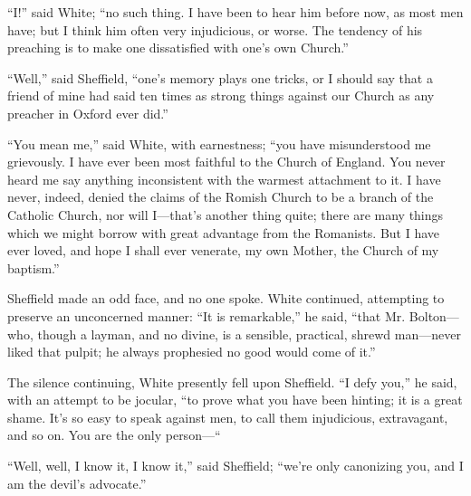 ``I!'' said White; ``no such thing. I have been to hear
him before now, as most men have; but I think him often very
injudicious, or worse. The tendency of his preaching is to make one
dissatisfied with one's own Church.''

``Well,'' said Sheffield, ``one's memory plays one
tricks, or I should say that a friend of mine had said ten times as
strong things against our Church as any preacher in Oxford ever
did.''

``You mean me,'' said White, with earnestness; ``you
have misunderstood me grievously. I have ever been most faithful to
the Church of England. You never heard me say anything inconsistent
with the warmest attachment to it. I have never, indeed, denied
the claims of the Romish Church to be a branch of the Catholic Church,
nor will I—that's another thing quite; there are many things which
we might borrow with great advantage from the Romanists. But I have
ever loved, and hope I shall ever venerate, my own Mother, the Church
of my baptism.''

Sheffield made an odd face, and no one spoke. White continued,
attempting to preserve an unconcerned manner: ``It is
remarkable,'' he said, ``that Mr. Bolton—who, though a
layman, and no divine, is a sensible, practical, shrewd man—never
liked that pulpit; he always prophesied no good would come of
it.''

The silence continuing, White presently fell upon Sheffield.
``I defy you,'' he said, with an attempt to be jocular,
``to prove what you have been hinting; it is a great shame. It's
so easy to speak against men, to call them injudicious, extravagant,
and so on. You are the only person—``

``Well, well, I know it, I know it,'' said Sheffield;
``we're only canonizing you, and I am the devil's advocate.''

